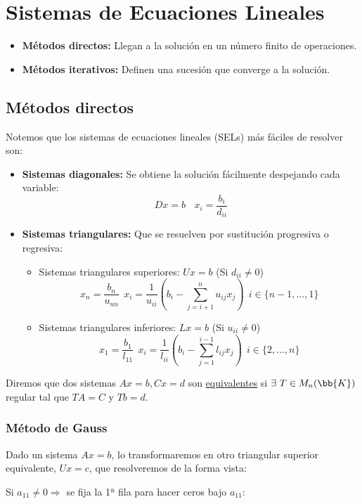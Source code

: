 \chapter{Sistemas de Ecuaciones Lineales}
\begin{itemize}
    \item \textbf{Métodos directos:} Llegan a la solución en un número finito de operaciones.
    \item \textbf{Métodos iterativos:} Definen una sucesión que converge a la solución.
\end{itemize}

\section{Métodos directos}
\noindent
Notemos que los sistemas de ecuaciones lineales (SELs) más fáciles de resolver son:
\begin{itemize}
    \item \textbf{Sistemas diagonales:} Se obtiene la solución fácilmente despejando cada variable:
          $$Dx=b~~~~x_i = \dfrac{b_i}{d_{ii}}$$
    \item \textbf{Sistemas triangulares:} Que se resuelven por sustitución progresiva o regresiva:
          \begin{itemize}
              \item Sistemas triangulares superiores: $Ux=b$ (Si $d_{ii}\neq 0$)
                    $$x_n=\dfrac{b_n}{u_{nn}}~~x_i=\dfrac{1}{u_{ii}}\left(b_i - \sum_{j=i+1}^n u_{ij}x_j\right)~~i\in\{n-1, \ldots, 1\}$$
              \item Sistemas triangulares inferiores: $Lx=b$ (Si $u_{ii}\neq 0$)
                    $$x_1=\dfrac{b_1}{l_{11}}~~x_i=\dfrac{1}{l_{ii}}\left(b_i - \sum_{j=1}^{i-1}l_{ij}x_j\right)~~i\in\{2, \ldots, n\}$$
          \end{itemize}
\end{itemize}

\noindent
Diremos que dos sistemas $Ax=b, Cx=d$ son \underline{equivalentes} si $\exists \ T \in M_n(\bb{K})$ regular tal que $TA=C$ y $Tb=d$.

\subsection{Método de Gauss}
\noindent
Dado un sistema $Ax=b$, lo transformaremos en otro triangular superior equivalente, $Ux=c$, que resolveremos de la forma vista:

Si $a_{11}\neq 0 \Rightarrow$ se fija la 1ª fila para hacer ceros bajo $a_{11}$:

